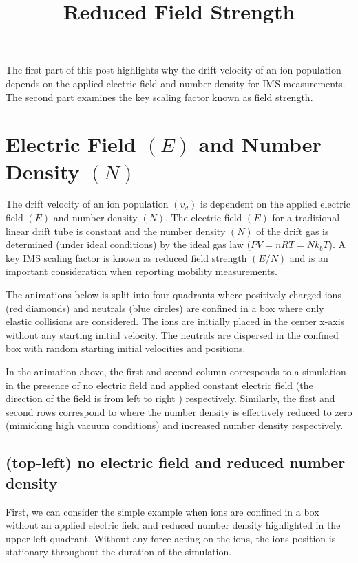\documentclass[10pt,a4paper,final]{article}
\title{Reduced Field Strength}
\begin{document}
The first part of this post highlights why the drift velocity of an ion population depends on the applied electric field and number density for IMS measurements. The second part examines the key scaling factor known as field strength.


\section{Electric Field $(E)$ and Number Density $(N)$}


The drift velocity of an ion population $(v_d)$ is dependent on the applied electric field $(E)$ and number density $(N)$. 
The electric field $(E)$ for a traditional linear drift tube is constant and the number density $(N)$ of the drift gas is determined (under ideal conditions) by the ideal gas law ($PV=nRT=Nk_bT$).
A key IMS scaling factor is known as reduced field strength $(E/N)$ and is an important consideration when reporting mobility measurements. 

The animations below is split into four quadrants where positively charged ions (red diamonds) and neutrals (blue circles) are confined in a box where only elastic collisions are considered.
The ions are initially placed in the center x-axis without any starting initial velocity. The neutrals are dispersed in the confined box with random starting initial velocities and positions.

In the animation above, the first and second column corresponds to a simulation in the presence of no electric field and applied constant electric field (the direction of the field is from left to right ) respectively. Similarly, the first and second rows correspond to where the number density is effectively reduced to zero (mimicking high vacuum conditions) and increased number density respectively.


\subsection{(top-left) no electric field and reduced number density}
First, we can consider the simple example when ions are confined in a box without an applied electric field and reduced number density highlighted in the upper left quadrant. Without any force acting on the ions, the ions position is stationary throughout the duration of the simulation.
\end{document}
